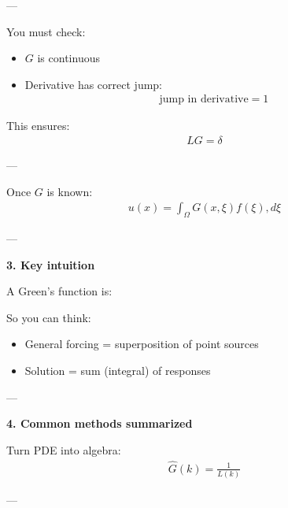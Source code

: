 \documentclass[12pt,a4paper]{report}
\begin{document}
\begin{description}
\begin{description}
\begin{description}
---

\item {}

You must check:

\begin{itemize}
\item $G$ is continuous
\item Derivative has correct jump:
\begin{align*}
  \text{jump in derivative} = 1
\end{align*}
\end{itemize}

This ensures:
\begin{align*}
L G = \delta
\end{align*}

---

\item {}

Once $G$ is known:
\begin{align*}
u(x) = \int_\Omega G(x,\xi) f(\xi), d\xi
\end{align*}

---
\end{description}

\item \textbf{3. Key intuition}

A Green’s function is:


So you can think:

\begin{itemize}
\item General forcing = superposition of point sources
\item Solution = sum (integral) of responses
\end{itemize}

---

\item \textbf{4. Common methods summarized}

\begin{description}
\item {}

Turn PDE into algebra:
\begin{align*}
\hat{G}(k) = \frac{1}{L(k)}
\end{align*}

---

\item {}


\end{description}
\end{description}
\end{description}
\end{document}
